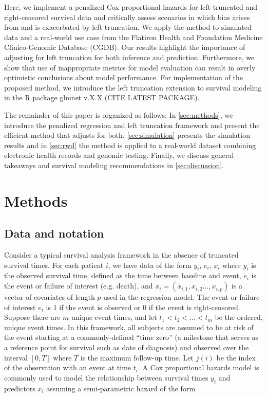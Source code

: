 \documentclass[11pt,final,fleqn]{article}\usepackage[]{graphicx}\usepackage[]{color}
\theoremstyle{plain}
\newcommand{\pkg}[1]{{\fontseries{b}\selectfont #1}}
\begin{document}
Here, we implement a penalized Cox proportional hazards for left-truncated and right-censored survival data and critically assess scenarios in which bias arises from and is exacerbated by left truncation. We apply the method to simulated data and a real-world use case from the Flatiron Health and Foundation Medicine Clinico-Genomic Database (CGDB). Our results highlight the importance of adjusting for left truncation for both inference and prediction. Furthermore, we show that use of inappropriate metrics for model evaluation can result in overly optimistic conclusions about model performance. For implementation of the proposed method, we introduce the left truncation extension to survival modeling in the R package \pkg{glmnet} v.X.X (CITE LATEST PACKAGE). 

The remainder of this paper is organized as follows: In \autoref{sec:methods}, we introduce the penalized regression and left truncation framework and present the efficient method that adjusts for both. \autoref{sec:simulation} presents the simulation results and in \autoref{sec:rwd} the method is applied to a real-world dataset combining electronic health records and genomic testing. Finally, we discuss general takeaways and survival modeling recommendations in \autoref{sec:discussion}. 

\section{Methods} \label{sec:methods}

\subsection{Data and notation} 
Consider a typical survival analysis framework in the absence of truncated survival times. For each patient $i$, we have data of the form $y_i$, $e_i$, $x_i$ where $y_i$ is the observed survival time, defined as the time between baseline and event, $e_i$ is the event or failure of interest (e.g. death), and $x_i = (x_{i,1}, x_{i,2} \ldots, x_{i,p})$ is a vector of covariates of length $p$ used in the regression model. The event or failure of interest $e_i$ is 1 if the event is observed or 0 if the event is right-censored. Suppose there are $m$ unique event times, and let $t_1 < t_2 < ... < t_m$ be the ordered, unique event times. In this framework, all subjects are assumed to be at risk of the event starting at a commonly-defined ``time zero'' (a milestone that serves as a reference point for survival such as date of diagnosis) and observed over the interval $[0,T]$ where $T$ is the maximum follow-up time. Let $j(i)$ be the index of the observation with an event at time $t_i$. A Cox proportional hazards model is commonly used to model the relationship between survival times $y_i$ and predictors $x_i$ assuming a semi-parametric hazard of the form
\end{document}

